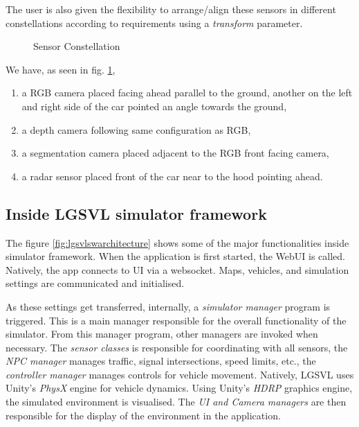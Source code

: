 The user is also given the flexibility to arrange/align these sensors in different constellations according to
requirements using a \textit{transform} parameter.
\begin{figure}[!ht]
	\centering
    \def\svgwidth{0.8\textwidth}
    \caption{Sensor Constellation}
    \label{fig:simplesensorconstellation}
\end{figure}
\newpage
We have, as seen in fig. \ref{fig:simplesensorconstellation},

\begin{enumerate}
    \item a RGB camera placed facing ahead parallel to the ground, another on
the left and right side of the car pointed an angle towards the ground,
    \item a depth camera following same configuration as RGB,
    \item a segmentation camera placed adjacent to the RGB front facing camera,
    \item a radar sensor placed front of the car near to the hood pointing ahead.
\end{enumerate}

\subsection{Inside LGSVL simulator framework}
The figure \ref{fig:lgsvlswarchitecture} shows some of the major functionalities inside
simulator framework. When the application is first started, the WebUI is called. Natively,
the app connects to UI via a websocket. Maps, vehicles, and simulation settings are
communicated and initialised.

As these settings get transferred, internally, a \textit{simulator manager} program is
triggered. This is a main manager responsible for the overall functionality of the
simulator. From this manager program, other managers are invoked when necessary. The
\textit{sensor classes} is responsible for coordinating with all sensors, the \textit{NPC
manager} manages traffic, signal intersections, speed limits, etc., the \textit{controller
manager} manages controls for vehicle movement. Natively, LGSVL uses Unity's \textit{PhysX} engine
for vehicle dynamics. Using Unity's \textit{HDRP} graphics engine, the simulated environment is visualised. The
\textit{UI and Camera managers} are then responsible for the display of the environment in
the application.

